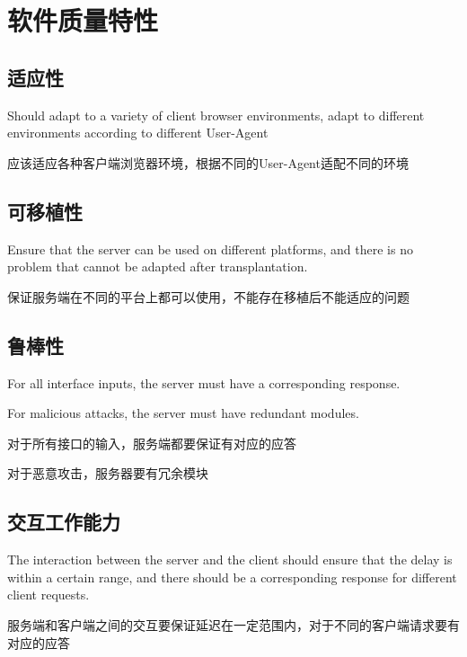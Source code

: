 \chapter{软件质量特性}

\section{适应性}
Should adapt to a variety of client browser environments, adapt to different environments according to different User-Agent

应该适应各种客户端浏览器环境，根据不同的User-Agent适配不同的环境

\section{可移植性}
Ensure that the server can be used on different platforms, and there is no problem that cannot be adapted after transplantation.

保证服务端在不同的平台上都可以使用，不能存在移植后不能适应的问题

\section{鲁棒性}
For all interface inputs, the server must have a corresponding response.

For malicious attacks, the server must have redundant modules.

对于所有接口的输入，服务端都要保证有对应的应答

对于恶意攻击，服务器要有冗余模块

\section{交互工作能力}
The interaction between the server and the client should ensure that the delay is within a certain range, and there should be a corresponding response for different client requests.

服务端和客户端之间的交互要保证延迟在一定范围内，对于不同的客户端请求要有对应的应答
